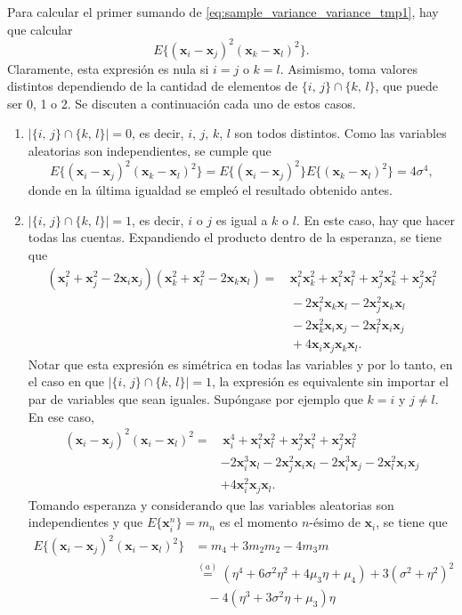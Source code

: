\documentclass[a4paper]{report}
\newcommand{\x}{\mathbf{x}}
\begin{document}
Para calcular el primer sumando de \ref{eq:sample_variance_variance_tmp1}, hay que calcular
\[
 E\{(\x_i-\x_j)^2(\x_k-\x_l)^2\}.
\] 
Claramente, esta expresión es nula si \(i=j\) o \(k=l\). Asimismo, toma valores distintos dependiendo de la cantidad de elementos de \(\{i,\,j\}\cap\{k,\,l\}\), que puede ser 0, 1 o 2. Se discuten a continuación cada uno de estos casos.
\begin{enumerate}
 \item \(|\{i,\,j\}\cap\{k,\,l\}|=0\), es decir, \(i,\,j,\,k,\,l\) son todos distintos. Como las variables aleatorias son independientes, se cumple que
 \[
  E\{(\x_i-\x_j)^2(\x_k-\x_l)^2\}=E\{(\x_i-\x_j)^2\}E\{(\x_k-\x_l)^2\}=4\sigma^4,
 \]
donde en la última igualdad se empleó el resultado obtenido antes.
 \item \(|\{i,\,j\}\cap\{k,\,l\}|=1\), es decir, \(i\) o \(j\) es igual a \(k\) o \(l\). En este caso, hay que hacer todas las cuentas. Expandiendo el producto dentro de la esperanza, se tiene que
 \begin{align*}
  (\x_i^2+\x_j^2-2\x_i\x_j)(\x_k^2+\x_l^2-2\x_k\x_l)=&\,\x_i^2\x_k^2+\x_i^2\x_l^2+\x_j^2\x_k^2+\x_j^2\x_l^2\\
    &\,-2\x_i^2\x_k\x_l-2\x_j^2\x_k\x_l\\
    &\,-2\x_k^2\x_i\x_j-2\x_l^2\x_i\x_j\\
    &\,+4\x_i\x_j\x_k\x_l.
 \end{align*}
 Notar que esta expresión es simétrica en todas las variables y por lo tanto, en el caso en que \(|\{i,\,j\}\cap\{k,\,l\}|=1\), la expresión es equivalente sin importar el par de variables que sean iguales. Supóngase por ejemplo que \(k=i\) y \(j\neq l\). En ese caso,
 \begin{align*}
  (\x_i-\x_j)^2(\x_i-\x_l)^2=&\,\x_i^4+\x_i^2\x_l^2+\x_j^2\x_i^2+\x_j^2\x_l^2\\
    &-2\x_i^3\x_l-2\x_j^2\x_i\x_l-2\x_i^3\x_j-2\x_l^2\x_i\x_j\\
    &+4\x_i^2\x_j\x_l.
 \end{align*}
 Tomando esperanza y considerando que las variables aleatorias son independientes y que \(E\{\x_i^n\}=m_n\) es el momento \(n\)-ésimo de \(\x_i\), se tiene que
 \begin{align*}
  E\{(\x_i-\x_j)^2(\x_i-\x_l)^2\}&=m_4+3m_2m_2-4m_3m\\
   &\overset{(a)}{=}(\eta^4+6\sigma^2\eta^2+4\mu_3\eta+\mu_4)+3(\sigma^2+\eta^2)^2\\
   &\quad-4(\eta^3+3\sigma^2\eta+\mu_3)\eta\\

\end{align*}
\end{enumerate}
\end{document}
